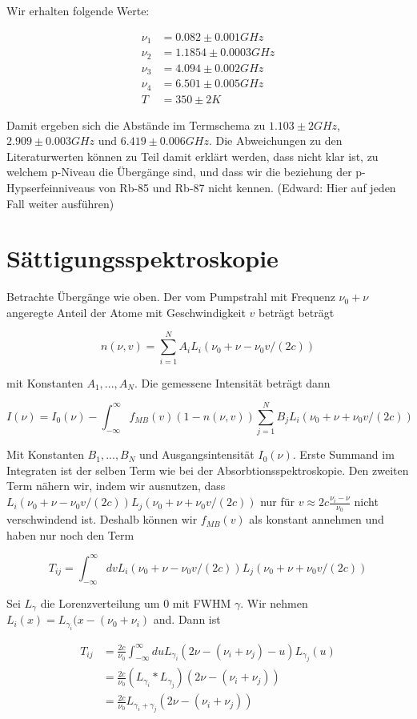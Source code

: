 \documentclass[a4paper,parskip]{scrartcl}
\begin{document}
Wir erhalten folgende Werte:

\begin{align*}
\nu_1 &= 0.082 \pm 0.001 GHz \\
\nu_2 &= 1.1854 \pm 0.0003 GHz \\
\nu_3 &= 4.094 \pm 0.002 GHz\\
\nu_4 &= 6.501 \pm 0.005 GHz \\
T&=350 \pm 2 K
\end{align*}

Damit ergeben sich die Abstände im Termschema zu $1.103 \pm 2 GHz$,  $2.909 \pm 0.003 GHz$ und $6.419 \pm 0.006 GHz$. Die Abweichungen zu den Literaturwerten können zu Teil damit erklärt werden, dass nicht klar ist, zu welchem p-Niveau die Übergänge sind, und dass wir die beziehung der p-Hypserfeinniveaus von Rb-85 und Rb-87 nicht kennen. ({\color{red}Edward: Hier auf jeden Fall weiter ausführen})

\section{Sättigungsspektroskopie}

Betrachte Übergänge wie oben. Der vom Pumpstrahl mit Frequenz $\nu_0+\nu$ angeregte Anteil der Atome mit Geschwindigkeit $v$ beträgt beträgt

$$n(\nu, v) = \sum_{i=1}^N A_i L_i(\nu_0+\nu-\nu_0 v/(2c))$$

mit Konstanten $A_1, ..., A_N$. Die gemessene Intensität beträgt dann

$$I(\nu) = I_0(\nu)-\int_{-\infty}^{\infty} f_{MB}(v)(1-n(\nu, v))\sum_{j=1}^N B_j L_i(\nu_0+\nu+\nu_0 v/(2c))$$

Mit Konstanten $B_1, ..., B_N$ und Ausgangsintensität $I_0(\nu)$. Erste Summand im Integraten ist der selben Term wie bei der Absorbtionsspektroskopie. Den zweiten Term nähern wir, indem wir ausnutzen, dass  $L_i(\nu_0+\nu-\nu_0 v/(2c)) L_j(\nu_0+\nu+\nu_0 v/(2c))$ nur für $v \approx 2c \frac{\nu_i-\nu}{\nu_0}$ nicht verschwindend ist. Deshalb können wir $f_{MB}(v)$ als konstant annehmen und haben nur noch den Term

$$T_{ij}=\int_{-\infty}^\infty dv L_i(\nu_0+\nu-\nu_0 v/(2c)) L_j(\nu_0+\nu+\nu_0 v/(2c))$$

Sei $L_\gamma$ die Lorenzverteilung um 0 mit FWHM $\gamma$. Wir nehmen $L_i(x) = L_{\gamma_i}(x-(\nu_0+\nu_i)$ and. Dann ist

\begin{align*}
T_{ij} &= \frac{2c}{\nu_0}\int_{-\infty}^\infty du L_{\gamma_i}(2\nu-(\nu_i+\nu_j)-u)L_{\gamma_j}(u)\\
&= \frac{2c}{\nu_0} (L_{\gamma_i} * L_{\gamma_j})(2\nu-(\nu_i+\nu_j)) \\
&= \frac{2c}{\nu_0} L_{\gamma_i+\gamma_j}(2\nu-(\nu_i+\nu_j)) \\
\end{align*}
\end{document}
